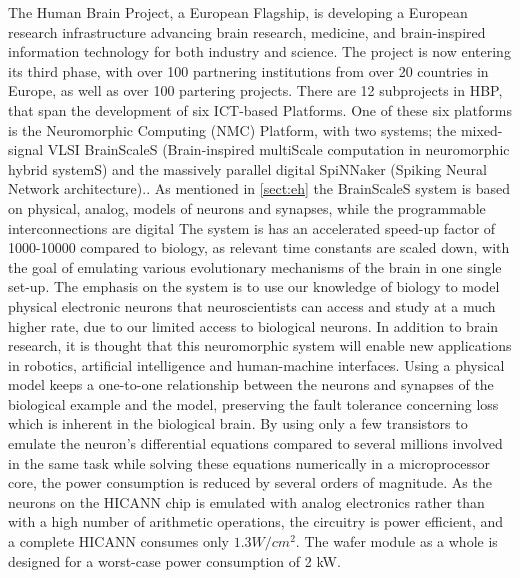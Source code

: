 The Human Brain Project, a European Flagship, is developing a European research infrastructure advancing brain research, medicine, and brain-inspired information technology for both industry and science.
The project is now entering its third phase, with over 100 partnering institutions from over 20 countries in Europe, as well as over 100 partering projects.
There are 12 subprojects in HBP, that span the development of six ICT-based Platforms.
One of these six platforms is the Neuromorphic Computing (NMC) Platform, with two systems;
the mixed-signal VLSI BrainScaleS (Brain-inspired multiScale computation in neuromorphic hybrid systemS) and the massively parallel digital SpiNNaker (Spiking Neural Network architecture).\cite{amunts_human_2016}.
As mentioned in \vref{sect:eh} the BrainScaleS system is based on physical, analog, models of neurons and synapses, while the programmable interconnections are digital \cite{zoschke_full_2017}
The system is has an accelerated speed-up factor of 1000-10000 compared to biology, as relevant time constants are scaled down, with the goal of emulating various evolutionary mechanisms of the brain in one single set-up.
The emphasis on the system is to use our knowledge of biology to model physical electronic neurons that neuroscientists can access and study at a much higher rate, due to our limited access to biological neurons.
In addition to brain research, it is thought that this neuromorphic system will enable new applications in robotics, artificial intelligence and human-machine interfaces.
Using a physical model keeps a one-to-one relationship between the neurons and synapses of the biological example and the model,
preserving the fault tolerance concerning loss which is inherent in the biological brain.
By using only a few transistors to emulate the neuron's differential equations compared to several millions involved in the same task while solving these equations numerically in a microprocessor core, the power consumption is reduced by several orders of magnitude.
\cite{schemmel_wafer-scale_2010}
As the neurons on the HICANN chip is emulated with analog electronics rather than with a high number of arithmetic operations, the circuitry is power efficient, and a complete HICANN consumes only $1.3 W/cm^2$.
The wafer module as a whole is designed for a worst-case power consumption of 2 kW.
\cite{zoschke_full_2017}

